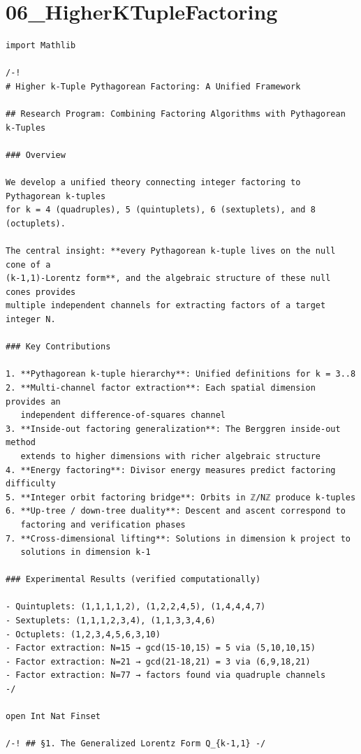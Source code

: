\documentclass[11pt,openany]{book}
\theoremstyle{definition}
\theoremstyle{plain}
\theoremstyle{remark}
\begin{document}
\clearpage

\section*{06\_HigherKTupleFactoring}

\begin{lstlisting}[style=lean]
import Mathlib

/-!
# Higher k-Tuple Pythagorean Factoring: A Unified Framework

## Research Program: Combining Factoring Algorithms with Pythagorean k-Tuples

### Overview

We develop a unified theory connecting integer factoring to Pythagorean k-tuples
for k = 4 (quadruples), 5 (quintuplets), 6 (sextuplets), and 8 (octuplets).

The central insight: **every Pythagorean k-tuple lives on the null cone of a
(k-1,1)-Lorentz form**, and the algebraic structure of these null cones provides
multiple independent channels for extracting factors of a target integer N.

### Key Contributions

1. **Pythagorean k-tuple hierarchy**: Unified definitions for k = 3..8
2. **Multi-channel factor extraction**: Each spatial dimension provides an
   independent difference-of-squares channel
3. **Inside-out factoring generalization**: The Berggren inside-out method
   extends to higher dimensions with richer algebraic structure
4. **Energy factoring**: Divisor energy measures predict factoring difficulty
5. **Integer orbit factoring bridge**: Orbits in ℤ/Nℤ produce k-tuples
6. **Up-tree / down-tree duality**: Descent and ascent correspond to
   factoring and verification phases
7. **Cross-dimensional lifting**: Solutions in dimension k project to
   solutions in dimension k-1

### Experimental Results (verified computationally)

- Quintuplets: (1,1,1,1,2), (1,2,2,4,5), (1,4,4,4,7)
- Sextuplets: (1,1,1,2,3,4), (1,1,3,3,4,6)
- Octuplets: (1,2,3,4,5,6,3,10)
- Factor extraction: N=15 → gcd(15-10,15) = 5 via (5,10,10,15)
- Factor extraction: N=21 → gcd(21-18,21) = 3 via (6,9,18,21)
- Factor extraction: N=77 → factors found via quadruple channels
-/

open Int Nat Finset

/-! ## §1. The Generalized Lorentz Form Q_{k-1,1} -/


\end{lstlisting}
\end{document}
